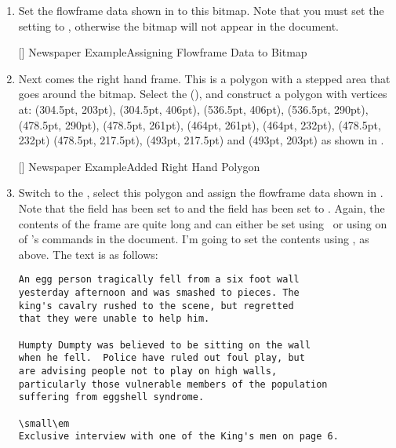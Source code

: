 \begin{enumerate}
[]
{}
{Newspaper Example\dash Added Image}

\item Set the \gls{flowframe} data shown in  to
this \gls{bitmap}. Note that you must set the
 setting to
, otherwise the \gls{bitmap}
will not appear in the document.

[]
{}
{Newspaper Example\dash Assigning Flowframe Data to Bitmap}

\item Next comes the right hand frame. This is a polygon with a
stepped area that goes around the bitmap. Select the
 (), and construct a
polygon with vertices at:
(304.5pt, 203pt), (304.5pt, 406pt), (536.5pt, 406pt),
(536.5pt, 290pt), (478.5pt, 290pt), (478.5pt, 261pt),
(464pt, 261pt), (464pt, 232pt), (478.5pt, 232pt)
(478.5pt, 217.5pt), (493pt, 217.5pt) and (493pt, 203pt) as shown in
.

[]
{}
{Newspaper Example\dash Added Right Hand Polygon}

\item Switch to the , select
this polygon and assign the \gls{flowframe} data shown in
. Note that the
 field has been set to
 and the
 field has been set to
. Again, the contents of the
frame are quite long and can either be set using \FlowframTk\ or
using on of 's commands in the document. I'm going to set
the contents using \FlowframTk, as above. The text is as follows:
\begin{verbatim}
An egg person tragically fell from a six foot wall 
yesterday afternoon and was smashed to pieces. The 
king's cavalry rushed to the scene, but regretted 
that they were unable to help him.

Humpty Dumpty was believed to be sitting on the wall 
when he fell.  Police have ruled out foul play, but
are advising people not to play on high walls, 
particularly those vulnerable members of the population 
suffering from eggshell syndrome.

\small\em
Exclusive interview with one of the King's men on page 6.
\end{verbatim}


\end{enumerate}

